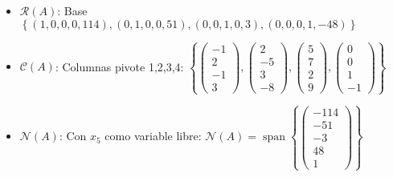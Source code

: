 \begin{prob}
\begin{myproof}
\begin{itemize}
    \item $\mathcal{R}(A)$: Base $\left\{ (1,0,0,0,114), (0,1,0,0,51), (0,0,1,0,3), (0,0,0,1,-48) \right\}$
    \item $\mathcal{C}(A)$: Columnas pivote 1,2,3,4: $\left\{ \begin{pmatrix}-1\\2\\-1\\3\end{pmatrix}, \begin{pmatrix}2\\-5\\3\\-8\end{pmatrix}, \begin{pmatrix}5\\7\\2\\9\end{pmatrix}, \begin{pmatrix}0\\0\\1\\-1\end{pmatrix} \right\}$
    \item $\mathcal{N}(A)$: Con $x_5$ como variable libre: $\mathcal{N}(A) = \operatorname{span}\left\{ \begin{pmatrix}-114\\-51\\-3\\48\\1\end{pmatrix} \right\}$
\end{itemize}
\end{myproof}
\end{prob}


